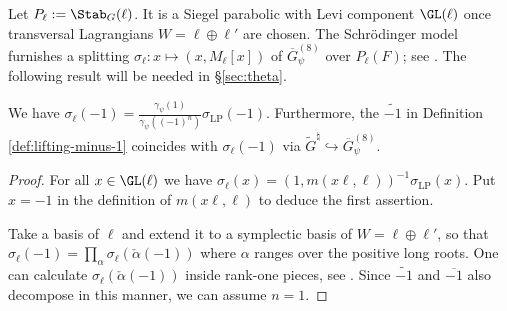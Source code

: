 \documentclass[a4paper,10pt]{article}
\begin{document}
Let $P_\ell := \Stab_G(\ell)$. It is a Siegel parabolic with Levi component $\GL(\ell)$ once transversal Lagrangians $W = \ell \oplus \ell'$ are chosen. The Schrödinger model furnishes a splitting $\sigma_\ell: x \mapsto (x, M_\ell[x])$ of $\overline{G}_\psi^{(8)}$ over $P_\ell(F)$; see \cite[Chapitre 2, II.6]{MVW87}. The following result will be needed in \S\ref{sec:theta}. 
\begin{proposition}\label{prop:convenient-Schrodinger}
	We have $\sigma_\ell(-1) = \frac{\gamma_\psi(1)}{\gamma_\psi((-1)^n)} \sigma_{\mathrm{LP}}(-1)$. Furthermore, the $\widetilde{-1}$ in Definition \ref{def:lifting-minus-1} coincides with $\sigma_\ell(-1)$ via $\tilde{G}^\natural \hookrightarrow \overline{G}^{(8)}_\psi$.
\end{proposition}
\begin{proof}
	For all $x \in \GL(\ell)$ we have $\sigma_\ell(x) = (1, m(x\ell, \ell))^{-1} \sigma_\text{LP}(x)$. Put $x=-1$ in the definition of $m(x\ell, \ell)$ to deduce the first assertion.

	Take a basis of $\ell$ and extend it to a symplectic basis of $W = \ell \oplus \ell'$, so that $\sigma_\ell(-1) = \prod_\alpha \sigma_\ell(\check{\alpha}(-1))$ where $\alpha$ ranges over the positive long roots. One can calculate $\sigma_\ell(\check{\alpha}(-1))$ inside rank-one pieces, see \cite[Chapitre 2, II.6]{MVW87}. Since $\widetilde{-1}$ and $\overline{-1}$ also decompose in this manner, we can assume $n=1$.


\end{proof}
\end{document}
